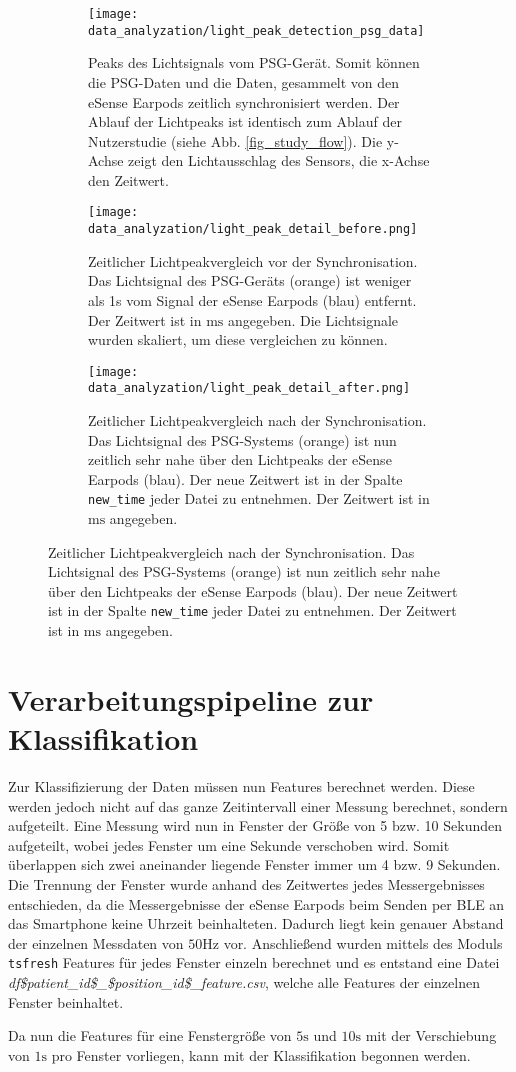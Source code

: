 \begin{figure}[ht]
  \centering
  \begin{subfigure}{0.66\textwidth}
    \texttt{[image: data\_analyzation/light\_peak\_detection\_psg\_data]}
    \caption{Peaks des Lichtsignals vom PSG-Gerät. Somit können die PSG-Daten und die Daten, gesammelt von den eSense Earpods zeitlich synchronisiert werden. Der Ablauf der Lichtpeaks ist identisch zum Ablauf der Nutzerstudie (siehe Abb. \ref{fig_study_flow}). Die y-Achse zeigt den Lichtausschlag des Sensors, die x-Achse den Zeitwert.}
  \end{subfigure}
  \begin{subfigure}{.49\textwidth}
    \texttt{[image: data\_analyzation/light\_peak\_detail\_before.png]}
    \caption{Zeitlicher Lichtpeakvergleich vor der Synchronisation. Das Lichtsignal des PSG-Geräts (orange) ist weniger als 1s vom Signal der eSense Earpods (blau) entfernt. Der Zeitwert ist in $\si{\ms}$ angegeben. Die Lichtsignale wurden skaliert, um diese vergleichen zu können. }
    \label{implementation:synchronisation:before_light_peak}
  \end{subfigure}
  \begin{subfigure}{.49\textwidth}
    \texttt{[image: data\_analyzation/light\_peak\_detail\_after.png]}
    \caption{Zeitlicher Lichtpeakvergleich nach der Synchronisation. Das Lichtsignal des PSG-Systems (orange) ist nun zeitlich sehr nahe über den Lichtpeaks der eSense Earpods (blau). Der neue Zeitwert ist in der Spalte \texttt{new\_time} jeder Datei zu entnehmen. Der Zeitwert ist in $\si{\ms}$ angegeben.}
    \label{implementation:synchronisation:after_light_peak}
  \end{subfigure}
  \label{implementation:synchronisation}
\end{figure}

\section{Verarbeitungspipeline zur Klassifikation}
\label{ch:Implementierung:classification_pipeline}
Zur Klassifizierung der Daten müssen nun Features berechnet werden. 
Diese werden jedoch nicht auf das ganze Zeitintervall einer Messung berechnet, sondern aufgeteilt.
Eine Messung wird nun in Fenster der Größe von 5 bzw. 10 Sekunden aufgeteilt, wobei jedes Fenster um eine Sekunde verschoben wird. 
Somit überlappen sich zwei aneinander liegende Fenster immer um 4 bzw. 9 Sekunden. 
Die Trennung der Fenster wurde anhand des Zeitwertes jedes Messergebnisses entschieden, da die Messergebnisse der eSense Earpods beim Senden per BLE an das Smartphone keine Uhrzeit beinhalteten.
Dadurch liegt kein genauer Abstand der einzelnen Messdaten von $50\si{\hertz}$ vor. 
Anschließend wurden mittels des Moduls \texttt{tsfresh} Features für jedes Fenster einzeln berechnet und es entstand eine Datei \textit{df\$patient\_id\$\_\$position\_id\$\_feature.csv}, welche alle Features der einzelnen Fenster beinhaltet.

Da nun die Features für eine Fenstergröße von $5\si{\s}$ und $10\si{\s}$ mit der Verschiebung von $1\si{\s}$ pro Fenster vorliegen, kann mit der Klassifikation begonnen werden.
